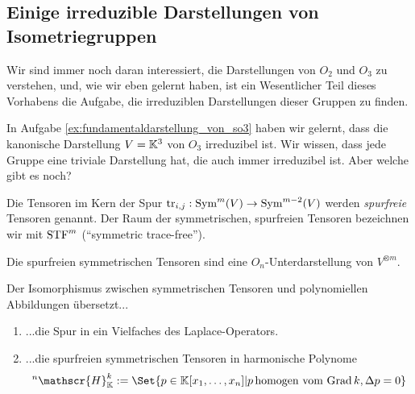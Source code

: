 \subsection{Einige irreduzible Darstellungen von Isometriegruppen}

\begin{remark}
Wir sind immer noch daran interessiert, die Darstellungen von $O_2$ und $O_3$ zu verstehen, und, wie wir eben gelernt haben, ist ein Wesentlicher Teil dieses Vorhabens die Aufgabe, die irreduziblen Darstellungen dieser Gruppen zu finden.

In Aufgabe \ref{ex:fundamentaldarstellung_von_so3} haben wir gelernt, dass die kanonische Darstellung $V=\mathbb{K}^3$ von $O_3$ irreduzibel ist. Wir wissen, dass jede Gruppe eine triviale Darstellung hat, die auch immer irreduzibel ist. Aber welche gibt es noch?
\end{remark}

\begin{definition}
Die Tensoren im Kern der Spur $\operatorname{tr}_{i,j} : \operatorname{Sym}^m(V) \to \operatorname{Sym}^{m-2}(V)$ werden \emph{spurfreie} Tensoren genannt. Der Raum der symmetrischen, spurfreien Tensoren bezeichnen wir mit $\operatorname{STF}^m$ (\enquote{symmetric trace-free}).
\end{definition}

\begin{lemma}
Die spurfreien symmetrischen Tensoren sind eine $O_n$-Unterdarstellung von $V^{\otimes m}$.
\end{lemma}

\begin{lemma}
Der Isomorphismus zwischen symmetrischen Tensoren und polynomiellen Abbildungen übersetzt...
\begin{enumerate}
\item ...die Spur in ein Vielfaches des Laplace-Operators.
\item ...die spurfreien symmetrischen Tensoren in harmonische Polynome
\[{^n}\mathscr{H}_\IK^k := \Set{p\in\IK[x_1,\ldots,x_n] | p\,\text{homogen vom Grad}\,k, \Delta p=0}\]
\end{enumerate}
\end{lemma}


